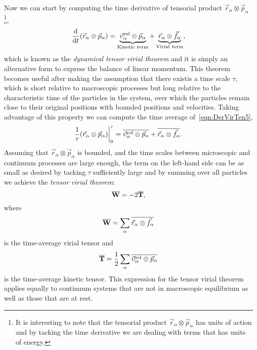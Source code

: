 \documentclass[../../main-notes.tex]{subfiles}
\begin{document}
Now we can start by computing the time derivative of tensorial product $\vec{r}_\alpha\otimes\vec{p}_\alpha$\footnote{It is interesting to note that the tensorial product $\vec{r}_\alpha\otimes\vec{p}_\alpha$ has units of action and by tacking the time derivative we are dealing with terms that has units of energy.
},
\begin{equation}
    \dv{t}\qty(\vec{r}_\alpha\otimes\vec{p}_\alpha) = 
    \underbrace{\vec{\upsilon}_\alpha^{\mathrm{rel}}\otimes\vec{p}_\alpha}_{\mathrm{Kinetic~term}} 
        +
        \underbrace{\vec{r}_\alpha\otimes\vec{f}_\alpha}_{\mathrm{Virial~term}},\label{eqn:DerVirTen5}
\end{equation}
which is known as the \textit{dynamical tensor virial theorem} and it is simply an alternative form to express the balance of linear momentum.
This theorem becomes useful after making the assumption that there existis a time scale $\tau$, which is short relative to macroscopic processes but long relative to the characteristic time of the particles in the system, over which the particles remain close to their original positions with bounded positions and velocities.
Taking advantage of this property we can compute the time average of~\eqref{eqn:DerVirTen5},
\begin{equation}
    \frac{1}{\tau}\qty(\vec{r}_\alpha\otimes\vec{p}_\alpha)\bigg|_{0}^{\tau} = 
    \overline{\vec{\upsilon}_\alpha^{\mathrm{rel}}\otimes\vec{p}_\alpha} 
        +
    \overline{\vec{r}_\alpha\otimes\vec{f}_\alpha}.\label{eqn:DerVirTen6}
\end{equation}
Assuming that $\vec{r}_\alpha\otimes\vec{p}_\alpha$ is bounded, and the time scales between microscopic and continuum processes are large enough, the term on the left-hand side can be as small as desired by tacking $\tau$ sufficiently large and by summing over all particles we achieve the \textit{tensor virial theorem}:
\begin{equation}
    \overline{\bold{W}} = -2\overline{\bold{T}},\label{eqn:DerVirTen7}
\end{equation}
where
\begin{equation}
    \overline{\bold{W}} = \sum_\alpha\overline{\vec{r}_\alpha\otimes\vec{f}_\alpha}\label{eqn:DerVirTen8}
\end{equation}
is the time-average virial tensor and
\begin{equation}
    \overline{\bold{T}}=\frac{1}{2}\sum_\alpha\overline{\vec{\upsilon}_\alpha^{\mathrm{rel}}\otimes\vec{p}_\alpha}\label{eqn:DerVirTen9}
\end{equation}
is the time-average kinetic tensor.
This expression for the tensor virial theorem applies equally to continuum systems that are not in macroscopic equilibrium as well as those that are at rest.
\end{document}
